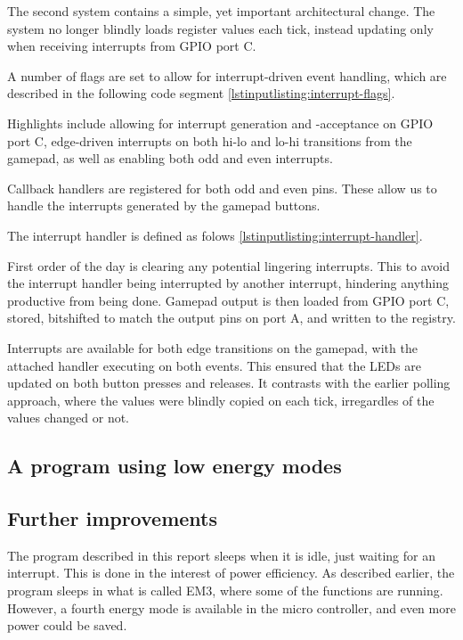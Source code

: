 The second system contains a simple, yet important architectural change. The system no longer blindly loads register values each tick, instead updating only when receiving interrupts from GPIO port C.

A number of flags are set to allow for interrupt-driven event handling, which are described in the following code segment \ref{lstinputlisting:interrupt-flags}.

Highlights include allowing for interrupt generation and -acceptance on GPIO port C, edge-driven interrupts on both hi-lo and lo-hi transitions from the gamepad, as well as enabling both odd and even interrupts.


\label{lstinputlisting:interrupt-flags}

Callback handlers are registered for both odd and even pins. These allow us to handle the interrupts generated by the gamepad buttons.


\label{lstinputlisting:interrupt-handlers}

The interrupt handler is defined as folows \ref{lstinputlisting:interrupt-handler}.

First order of the day is clearing any potential lingering interrupts. This to avoid the interrupt handler being interrupted by another interrupt, hindering anything productive from being done.
Gamepad output is then loaded from GPIO port C, stored, bitshifted to match the output pins on port A, and written to the registry.

Interrupts are available for both edge transitions on the gamepad, with the attached handler executing on both events.
This ensured that the LEDs are updated on both button presses and releases. It contrasts with the earlier polling approach, where the values were blindly copied on each tick, irregardles of the values changed or not.



\label{lstinputlisting:interrupt-handler}

\subsection{A program using low energy modes}

\subsection{Further improvements}
The program described in this report sleeps when it is idle, just waiting for an interrupt.
This is done in the interest of power efficiency.
As described earlier, the program sleeps in what is called EM3, where some of the functions are running.
However, a fourth energy mode is available in the micro controller, and even more power could be saved.

